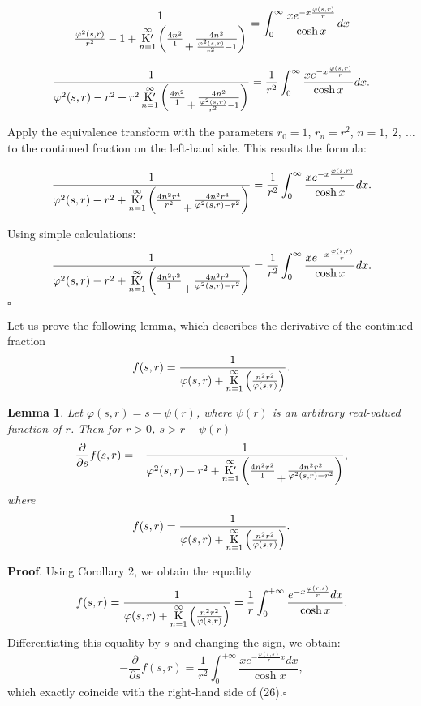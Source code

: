 \documentclass[a4paper,10pt]{article}      %
\newcommand{\K}{\operatornamewithlimits{K}}
\newcommand{\TK}{\operatornamewithlimits{K^{\prime}}}
\newcommand{\low}[1]{\genfrac{}{}{0cm}{0}{}{#1}}
\newtheorem{lemma}{Lemma}[section]
\begin{document}
$$\dfrac{1}{\frac{\varphi^2(s,r)}{r^2} -1 + \TK\limits_{n=1}^{\infty}\left(\frac{4n^2}{1} \low{+} \frac{4n^2}{\frac{\varphi^2(s,r)}{r^2}-1}\right)}
=\int_0^{\infty} \dfrac{xe^{-x\frac{\varphi(s,r)}{r}}}{\cosh x}dx$$

$$\dfrac{1}{\varphi^2(s,r) - r^2 + r^2\TK\limits_{n=1}^{\infty}\left(\frac{4n^2}{1} \low{+} \frac{4n^2}{\frac{\varphi^2(s,r)}{r^2}-1}\right)}
=\dfrac{1}{r^2}\int_0^{\infty} \dfrac{xe^{-x\frac{\varphi(s,r)}{r}}}{\cosh x}dx. $$

Apply the equivalence transform with the parameters $r_0 = 1$, $r_n = r^2$, $n = 1, \ 2, \ \ldots$ to the continued fraction on the left-hand side. This results the formula:

$$\dfrac{1}{\varphi^2(s,r) - r^2 + \TK\limits_{n=1}^{\infty}\left(\frac{4n^2r^4}{r^2} \low{+} \frac{4n^2r^4}{\varphi^2(s,r)-r^2}\right)}
=\dfrac{1}{r^2}\int_0^{\infty} \dfrac{xe^{-x\frac{\varphi(s,r)}{r}}}{\cosh x}dx. $$

Using simple calculations:
$$\dfrac{1}{\varphi^2(s,r) - r^2 + \TK\limits_{n=1}^{\infty}\left(\frac{4n^2r^2}{1} \low{+} \frac{4n^2r^2}{\varphi^2(s,r)-r^2}\right)}
=\dfrac{1}{r^2}\int_0^{\infty} \dfrac{xe^{-x\frac{\varphi(s,r)}{r}}}{\cosh x}dx. $$\hfill $\square$


Let us prove the following lemma, which describes
the derivative of the continued fraction $$f(s,r) = \dfrac{1}{\varphi(s,r) + \K\limits_{n=1}^\infty \left(\frac{n^2r^2}{\varphi(s,r)}\right)}.$$

\begin{lemma} Let $\varphi(s,r) = s + \psi(r)$, where $\psi(r)$ is an arbitrary real-valued function of $r$. Then for $r>0$, $s > r - \psi(r)$
$$\frac{\partial}{\partial s}f(s,r) = - \dfrac{1}{\varphi^2(s,r) - r^2 + \TK\limits_{n=1}^{\infty}\left(\frac{4n^2r^2}{1} \low{+} \frac{4n^2r^2}{\varphi^2(s,r)-r^2}\right)}, $$ where $$f(s,r) = \dfrac{1}{\varphi(s,r) + \K\limits_{n=1}^\infty \left(\frac{n^2r^2}{\varphi(s,r)}\right)}.$$
\end{lemma}

{\bf Proof}.
Using Corollary 2, we obtain the equality $$f(s,r) = \dfrac{1}{\varphi(s,r) + \K\limits_{n=1}^\infty \left(\frac{n^2r^2}{\varphi(s,r)}\right)} = \frac{1}{r}\int_0^{+\infty} \dfrac{e^{-x\frac{\varphi(r,s)}{r}}dx}{\cosh x}.$$ Differentiating this equality by $s$ and changing the sign, we obtain: $$- \frac{\partial}{\partial s}f(s,r) = \frac{1}{r^2}\int_0^{+\infty} \dfrac{xe^{-\frac{\varphi(r,s)}{r}x}dx}{\cosh x},$$ which exactly coincide with the right-hand side of (26).\hfill $\square$
\end{document}
